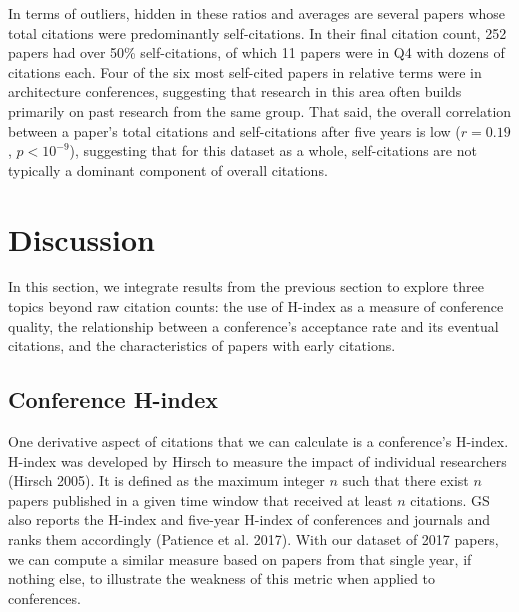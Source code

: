 \documentclass{article}
\begin{document}
In terms of outliers, hidden in these ratios and averages are several papers whose total citations were predominantly self-citations.
In their final citation count, 252 papers had over 50\% self-citations, of which 11 papers were in Q4 with dozens of citations each.
Four of the six most self-cited papers in relative terms were in architecture conferences, suggesting that research in this area often builds primarily on past research from the same group.
That said, the overall correlation between a paper's total citations and self-citations after five years is low
(\(r=0.19\), \(p<10^{-9}\)),
suggesting that for this dataset as a whole, self-citations are not typically a dominant component of overall citations.

\hypertarget{sec:discussion}{%
\section{Discussion}\label{sec:discussion}}

In this section, we integrate results from the previous section to explore three topics beyond raw citation counts: the use of H-index as a measure of conference quality, the relationship between a conference's acceptance rate and its eventual citations, and the characteristics of papers with early citations.

\hypertarget{conference-h-index}{%
\subsection{Conference H-index}\label{conference-h-index}}

One derivative aspect of citations that we can calculate is a conference's H-index.
H-index was developed by Hirsch to measure the impact of individual researchers (Hirsch 2005).
It is defined as the maximum integer \(n\) such that there exist \(n\) papers published in a given time window that received at least \(n\) citations.
GS also reports the H-index and five-year H-index of conferences and journals and ranks them accordingly (Patience et al. 2017).
With our dataset of 2017 papers, we can compute a similar measure based on papers from that single year, if nothing else, to illustrate the weakness of this metric when applied to conferences.
\end{document}
